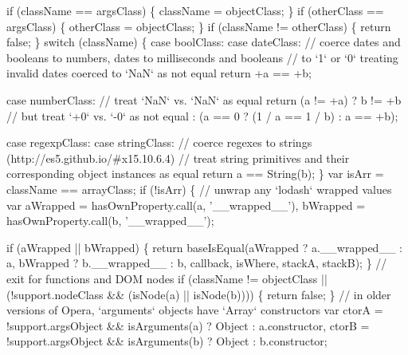 \begin{DoxyCodeInclude}
      \textcolor{keywordflow}{if} (className == argsClass) \{
        className = objectClass;
      \}
      \textcolor{keywordflow}{if} (otherClass == argsClass) \{
        otherClass = objectClass;
      \}
      \textcolor{keywordflow}{if} (className != otherClass) \{
        \textcolor{keywordflow}{return} \textcolor{keyword}{false};
      \}
      \textcolor{keywordflow}{switch} (className) \{
        \textcolor{keywordflow}{case} boolClass:
        \textcolor{keywordflow}{case} dateClass:
          \textcolor{comment}{// coerce dates and booleans to numbers, dates to milliseconds and booleans}
          \textcolor{comment}{// to `1` or `0` treating invalid dates coerced to `NaN` as not equal}
          \textcolor{keywordflow}{return} +a == +b;

        \textcolor{keywordflow}{case} numberClass:
          \textcolor{comment}{// treat `NaN` vs. `NaN` as equal}
          \textcolor{keywordflow}{return} (a != +a)
            ? b != +b
            \textcolor{comment}{// but treat `+0` vs. `-0` as not equal}
            : (a == 0 ? (1 / a == 1 / b) : a == +b);

        \textcolor{keywordflow}{case} regexpClass:
        \textcolor{keywordflow}{case} stringClass:
          \textcolor{comment}{// coerce regexes to strings (http://es5.github.io/#x15.10.6.4)}
          \textcolor{comment}{// treat string primitives and their corresponding object instances as equal}
          \textcolor{keywordflow}{return} a == String(b);
      \}
      var isArr = className == arrayClass;
      \textcolor{keywordflow}{if} (!isArr) \{
        \textcolor{comment}{// unwrap any `lodash` wrapped values}
        var aWrapped = hasOwnProperty.call(a, \textcolor{stringliteral}{'\_\_wrapped\_\_'}),
            bWrapped = hasOwnProperty.call(b, \textcolor{stringliteral}{'\_\_wrapped\_\_'});

        \textcolor{keywordflow}{if} (aWrapped || bWrapped) \{
          \textcolor{keywordflow}{return} baseIsEqual(aWrapped ? a.\_\_wrapped\_\_ : a, bWrapped ? b.\_\_wrapped\_\_ : b, callback, isWhere,
       stackA, stackB);
        \}
        \textcolor{comment}{// exit for functions and DOM nodes}
        \textcolor{keywordflow}{if} (className != objectClass || (!support.nodeClass && (isNode(a) || isNode(b)))) \{
          \textcolor{keywordflow}{return} \textcolor{keyword}{false};
        \}
        \textcolor{comment}{// in older versions of Opera, `arguments` objects have `Array` constructors}
        var ctorA = !support.argsObject && isArguments(a) ? Object : a.constructor,
            ctorB = !support.argsObject && isArguments(b) ? Object : b.constructor;


\end{DoxyCodeInclude}
